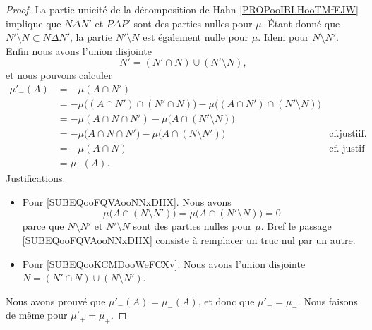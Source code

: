 \begin{proof}
	La partie unicité de la décomposition de Hahn \ref{PROPooIBLHooTMfEJW} implique que \( N\Delta N'\) et \( P\Delta P'\) sont des parties nulles pour \( \mu\). Étant donné que \( N'\setminus N\subset N\Delta N'\), la partie \( N'\setminus N\) est également nulle pour \( \mu\). Idem pour \( N\setminus N'\). Enfin nous avons l'union disjointe
	\begin{equation}
		N'=(N'\cap N)\cup(N'\setminus N),
	\end{equation}
	et nous pouvons calculer
	\begin{subequations}
		\begin{align}
			\mu'_-(A) & = - \mu(A\cap N')                                                                                                                            \\
			          & = - \mu\big((A\cap N')\cap (N'\cap N)\big)-\mu\big(  (A\cap N')\cap (N'\setminus N)  \big)                                                   \\
			          & = - \mu(A\cap N\cap N') - \mu\big(  A\cap (N'\setminus N) \big)                                                                              \\
			          & = - \mu\big(   A\cap N\cap N' \big)-\mu\big(  A\cap (N\setminus N')  \big)                 & \text{cf.justiif.}  \label{SUBEQooFQVAooNNxDHX} \\
			          & = - \mu(A\cap N)                                                                           & \text{cf. justif}	\label{SUBEQooKCMDooWeFCXv}   \\
			          & = \mu_-(A).
		\end{align}
	\end{subequations}
	Justifications.
	\begin{itemize}
		\item
		      Pour \eqref{SUBEQooFQVAooNNxDHX}. Nous avons
		      \begin{equation}
			      \mu\big( A\cap (N\setminus N') \big)=\mu\big( A\cap (N'\setminus N) \big)=0
		      \end{equation}
		      parce que \( N\setminus N'\) et \( N'\setminus N\) sont des parties nulles pour \( \mu\). Bref le passage \eqref{SUBEQooFQVAooNNxDHX} consiste à remplacer un truc nul par un autre.
		\item
		      Pour \eqref{SUBEQooKCMDooWeFCXv}. Nous avons l'union disjointe \( N=(N'\cap N)\cup(N\setminus N')\).
	\end{itemize}
	Nous avons prouvé que \( \mu'_-(A)=\mu_-(A)\), et donc que \( \mu'_-=\mu_-\). Nous faisons de même pour \( \mu'_+=\mu_+\).
\end{proof}


